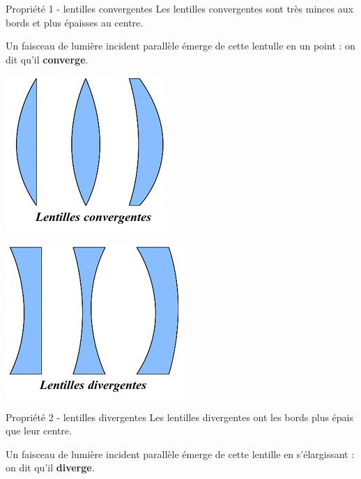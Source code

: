 \documentclass[french, a4paper, 12pt]{article}
\begin{document}
\begin{minipage}{.6\textwidth}
\begin{Proposition}{Propriété 1 - lentilles convergentes}
	Les lentilles convergentes sont très minces aux bords et plus épaisses au centre.\medskip
	
	Un faisceau de lumière incident parallèle émerge de cette lentulle en un point : on dit qu'il \textbf{converge}.

\end{Proposition}
\end{minipage}\hfill
\begin{minipage}{.3\textwidth}
	\includegraphics[width=.7\textwidth]{lentillecovnergente.png}
\end{minipage}\medskip

\begin{minipage}{.3\textwidth}
	\includegraphics[width=.7\textwidth]{lentilledivergente.png}
\end{minipage}\hfill
\begin{minipage}{.6\textwidth}
	\begin{Proposition}{Propriété 2 - lentilles divergentes}
	Les lentilles divergentes ont les bords plus épais que leur centre.\medskip
	
	Un faisceau de lumière incident parallèle émerge de cette lentille en s'élargissant : on dit qu'il \textbf{diverge}.
\end{Proposition}
\end{minipage}
\end{document}
